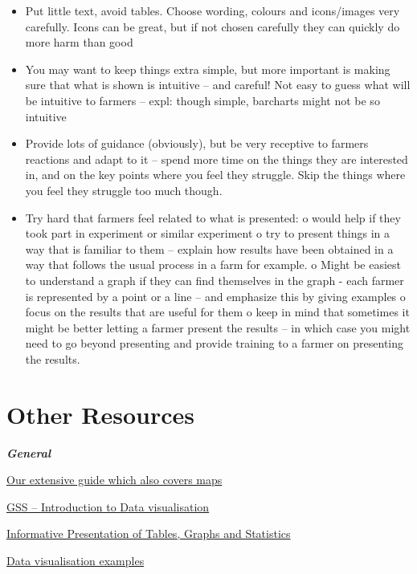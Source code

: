 \documentclass[
]{book}
\providecommand{\tightlist}{%
  \setlength{\itemsep}{0pt}\setlength{\parskip}{0pt}}
\begin{document}
\begin{itemize}
\tightlist
\item
  Put little text, avoid tables. Choose wording, colours and icons/images very carefully. Icons can be great, but if not chosen carefully they can quickly do more harm than good
\item
  You may want to keep things extra simple, but more important is making sure that what is shown is intuitive -- and careful! Not easy to guess what will be intuitive to farmers -- expl: though simple, barcharts might not be so intuitive
\item
  Provide lots of guidance (obviously), but be very receptive to farmers reactions and adapt to it -- spend more time on the things they are interested in, and on the key points where you feel they struggle. Skip the things where you feel they struggle too much though.
\item
  Try hard that farmers feel related to what is presented:
  o would help if they took part in experiment or similar experiment
  o try to present things in a way that is familiar to them -- explain how results have been obtained in a way that follows the usual process in a farm for example.
  o Might be easiest to understand a graph if they can find themselves in the graph - each farmer is represented by a point or a line -- and emphasize this by giving examples
  o focus on the results that are useful for them
  o keep in mind that sometimes it might be better letting a farmer present the results -- in which case you might need to go beyond presenting and provide training to a farmer on presenting the results.
\end{itemize}

\hypertarget{other-resources-2}{%
\section{Other Resources}\label{other-resources-2}}

\textbf{\emph{General}}

\href{}{Our extensive guide which also covers maps}

\href{https://gss.civilservice.gov.uk/policy-store/introduction-to-data-visualisation/\#section-7}{GSS -- Introduction to Data visualisation}

\href{https://stats4sd.org/resources/412}{Informative Presentation of Tables, Graphs and Statistics}

\href{https://stats4sd.org/resources/59}{Data visualisation examples}
\end{document}

